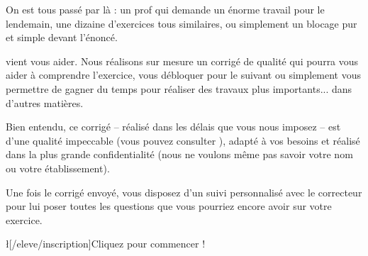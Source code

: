 On est tous passé par là : un prof qui demande un énorme travail pour le lendemain, une dizaine d'exercices tous similaires, ou simplement un blocage pur et simple devant l'énoncé.

\eDevoir vient vous aider. Nous réalisons sur mesure un corrigé de qualité qui pourra vous aider à comprendre l'exercice, vous débloquer pour le suivant ou simplement vous permettre de gagner du temps pour réaliser des travaux plus importants... dans d'autres matières.

Bien entendu, ce corrigé -- réalisé dans les délais que vous nous imposez -- est d'une qualité impeccable (vous pouvez consulter ), adapté à vos besoins et réalisé dans la plus grande confidentialité (nous ne voulons même pas savoir votre nom ou votre établissement).

Une fois le corrigé envoyé, vous disposez d'un suivi personnalisé avec le correcteur pour lui poser toutes les questions que vous pourriez encore avoir sur votre exercice.

\l[/eleve/inscription]{Cliquez pour commencer !}